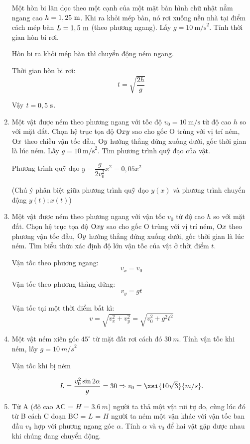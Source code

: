 \begin{enumerate}[label=\bfseries Câu \arabic*:]
	
	{Một hòn bi lăn dọc theo một cạnh của một mặt bàn hình chữ nhật nằm ngang cao $h=1,25\ \text m$. Khi ra khỏi mép bàn, nó rơi xuống nền nhà tại điểm cách mép bàn $L=1,5\ \text m$ (theo phương ngang). Lấy $g=10\ \text{m/s}^2$. Tính thời gian hòn bi rơi.
	}
	
	\hideall
	{	Hòn bi ra khỏi mép bàn thì chuyển động ném ngang.
		
		Thời gian hòn bi rơi:
		\[t=\sqrt{\dfrac{2h}{g}}\]
		
		Vậy $t= 0,5\ \text s$.
	}
	\item {}
	
	
	{Một vật được ném theo phương ngang với tốc độ $v_0 = 10\ \text{m/s}$ từ độ cao $h$ so với mặt đất. Chọn hệ trục tọa độ $\text Oxy$ sao cho gốc O trùng với vị trí ném, $\text O x$ theo chiều vận tốc đầu, $\text Oy$ hướng thẳng đứng xuống dưới, gốc thời gian là lúc ném. Lấy $g=10\ \text{m/s}^2$. Tìm phương trình quỹ đạo của vật.
	}
	
	\hideall
	{	Phương trình quỹ đạo $y=\dfrac{g}{2v_0^2}x^2 = 0,05x^2$
		
		(Chú ý phân biệt giữa phương trình quỹ đạo $y(x)$ và phương trình chuyển động $y(t); x(t)$)
	}
	\item {}
	
	
	{Một vật được ném theo phương ngang với vận tốc $v_0$ từ độ cao $h$ so với mặt đất. Chọn hệ trục tọa độ $\text Oxy$ sao cho gốc O trùng với vị trí ném, $\text Ox$ theo phương vận tốc đầu, $\text Oy$ hướng thẳng đứng xuống dưới, gốc thời gian là lúc ném. Tìm biểu thức xác định độ lớn vận tốc của vật ở thời điểm $t$.
	}
	
	\hideall
	{	Vận tốc theo phương ngang:
		\[v_x = v_0\]
		
		Vận tốc theo phương thẳng đứng:
		\[v_y=gt\]
		
		Vận tốc tại một thời điểm bất kì:
		\[v=\sqrt{v_x ^2 + v_y ^2 } = \sqrt{v_0^2 + g^2 t^2}\]
	}
	\item {}
	
	
	{Một vật ném xiên góc $45^\circ$ từ mặt đất rơi cách đó $\SI{30}{m}$. Tính vận tốc khi ném, lấy $g=\SI{10}{m/s}^2$
	}
	
	\hideall
	{	
		
		Vận tốc khi bị ném
		
		$$L = \dfrac{v^2_0 \sin 2\alpha}{g} = 30 \Rightarrow v_0 = \xsi{10\sqrt 3}{m/s}.$$
	}

		\item {}
	
	
	{Từ A (độ cao AC = $H$ = $\SI{3,6}{m}$) người ta thả một vật rơi tự do, cùng lúc đó từ B cách C đoạn BC = $L$ = $H$ người ta ném một vận khác với vận tốc ban đầu $v_0$ hợp với phương ngang góc $\alpha$. Tính $\alpha$ và $v_0$ để hai vật gặp được nhau khi chúng đang chuyển động.
		
}
\end{enumerate}

